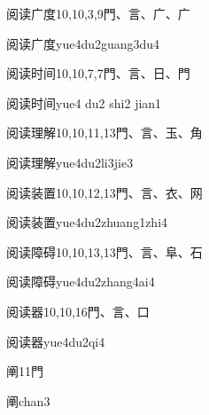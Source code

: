 \begin{Entry}{阅读广度}{10,10,3,9}{⾨、⾔、⼴、⼴}
  \begin{Phonetics}{阅读广度}{yue4du2guang3du4}
  \end{Phonetics}
\end{Entry}

\begin{Entry}{阅读时间}{10,10,7,7}{⾨、⾔、⽇、⾨}
  \begin{Phonetics}{阅读时间}{yue4 du2 shi2 jian1}
  \end{Phonetics}
\end{Entry}

\begin{Entry}{阅读理解}{10,10,11,13}{⾨、⾔、⽟、⾓}
  \begin{Phonetics}{阅读理解}{yue4du2li3jie3}
  \end{Phonetics}
\end{Entry}

\begin{Entry}{阅读装置}{10,10,12,13}{⾨、⾔、⾐、⽹}
  \begin{Phonetics}{阅读装置}{yue4du2zhuang1zhi4}
  \end{Phonetics}
\end{Entry}

\begin{Entry}{阅读障碍}{10,10,13,13}{⾨、⾔、⾩、⽯}
  \begin{Phonetics}{阅读障碍}{yue4du2zhang4ai4}
  \end{Phonetics}
\end{Entry}

\begin{Entry}{阅读器}{10,10,16}{⾨、⾔、⼝}
  \begin{Phonetics}{阅读器}{yue4du2qi4}
  \end{Phonetics}
\end{Entry}

\begin{Entry}{阐}{11}{⾨}
  \begin{Phonetics}{阐}{chan3}
  \end{Phonetics}
\end{Entry}

